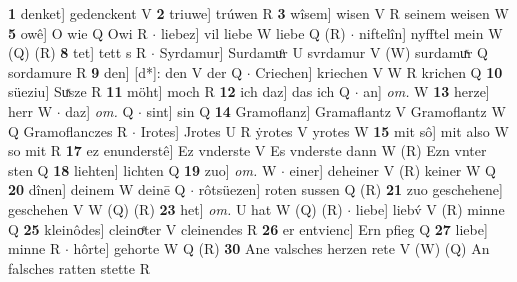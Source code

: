 \documentclass[8pt,a4paper,notitlepage]{article}
\begin{document}
\begin{table}[ht]
\begin{minipage}[t]{0.5\linewidth}
\textbf{1} denket] gedenckent V \textbf{2} triuwe] trúwen R \textbf{3} wîsem] wisen V R seinem weisen W \textbf{5} owê] O wie Q Owi R  $\cdot$ liebez] vil liebe W liebe Q (R)  $\cdot$ niftelîn] nyfftel mein W (Q) (R) \textbf{8} tet] tett s R  $\cdot$ Syrdamur] Surdamuͦr U svrdamur V (W) surdamuͯr Q sordamure R \textbf{9} den] [d*]: den V der Q  $\cdot$ Criechen] kriechen V W R krichen Q \textbf{10} süeziu] Suͯsze R \textbf{11} möht] moch R \textbf{12} ich daz] das ich Q  $\cdot$ an] \textit{om.} W \textbf{13} herze] herr W  $\cdot$ daz] \textit{om.} Q  $\cdot$ sint] sin Q \textbf{14} Gramoflanz] Gramaflantz V Gramoflantz W Q Gramoflanczes R  $\cdot$ Irotes] Jrotes U R ẏrotes V yrotes W \textbf{15} mit sô] mit also W so mit R \textbf{17} ez enunderstê] Ez vnderste V Es vnderste dann W (R) Ezn vnter sten Q \textbf{18} liehten] lichten Q \textbf{19} zuo] \textit{om.} W  $\cdot$ einer] deheiner V (R) keiner W Q \textbf{20} dînen] deinem W deinē Q  $\cdot$ rôtsüezen] roten sussen Q (R) \textbf{21} zuo geschehene] geschehen V W (Q) (R) \textbf{23} het] \textit{om.} U hat W (Q) (R)  $\cdot$ liebe] liebv́ V (R) minne Q \textbf{25} kleinôdes] cleinoͤter V cleinendes R \textbf{26} er entvienc] Ern pfieg Q \textbf{27} liebe] minne R  $\cdot$ hôrte] gehorte W Q (R) \textbf{30} Ane valsches herzen rete V (W) (Q) An falsches ratten stette R \newline
\end{minipage}
\end{table}
\end{document}
